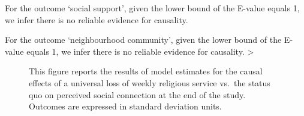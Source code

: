 \documentclass[
  singlecolumn]{article}
\begin{document}
For the outcome `social support', given the lower bound of the E-value
equals 1, we infer there is no reliable evidence for causality.

For the outcome `neighbourhood community', given the lower bound of the
E-value equals 1, we infer there is no reliable evidence for causality.
\textgreater{}

\newpage{}

\begin{figure}


\caption{\label{fig-2_3}This figure reports the results of model
estimates for the causal effects of a universal loss of weekly religious
service vs.~the status quo on perceived social connection at the end of
the study. Outcomes are expressed in standard deviation units.}

\end{figure}%
\end{document}
